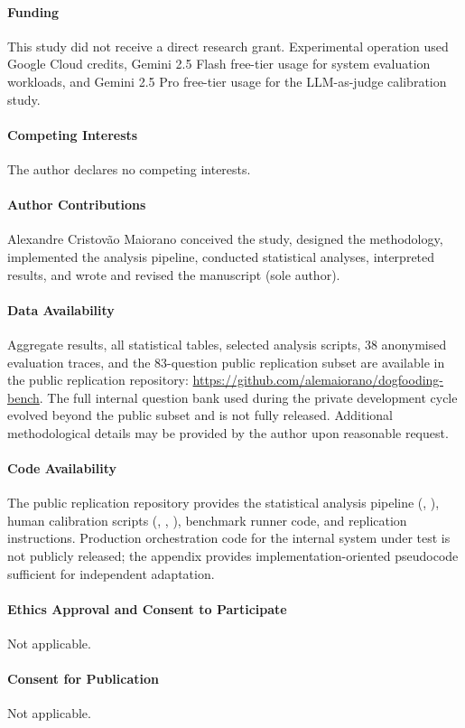 \documentclass[twocolumn]{svjour3}          %
\begin{document}
\paragraph{Funding}
This study did not receive a direct research grant. Experimental operation used Google Cloud credits, Gemini 2.5 Flash free-tier usage for system evaluation workloads, and Gemini 2.5 Pro free-tier usage for the LLM-as-judge calibration study.

\paragraph{Competing Interests}
The author declares no competing interests.

\paragraph{Author Contributions}
Alexandre Cristov\~ao Maiorano conceived the study, designed the methodology, implemented the analysis pipeline, conducted statistical analyses, interpreted results, and wrote and revised the manuscript (sole author).

\paragraph{Data Availability}
Aggregate results, all statistical tables, selected analysis scripts, 38
anonymised evaluation traces, and the 83-question public replication subset are
available in the public replication repository:
\url{https://github.com/alemaiorano/dogfooding-bench}. The full internal
question bank used during the private development cycle evolved beyond the
public subset and is not fully released. Additional methodological details may
be provided by the author upon reasonable request.

\paragraph{Code Availability}
\begin{sloppypar}
The public replication repository provides the statistical analysis pipeline
(, ), human calibration
scripts (, ,
), benchmark runner code, and replication
instructions. Production orchestration code for the internal system under test
is not publicly released; the appendix provides implementation-oriented
pseudocode sufficient for independent adaptation.
\end{sloppypar}

\paragraph{Ethics Approval and Consent to Participate}
Not applicable.

\paragraph{Consent for Publication}
Not applicable.



\end{document}
